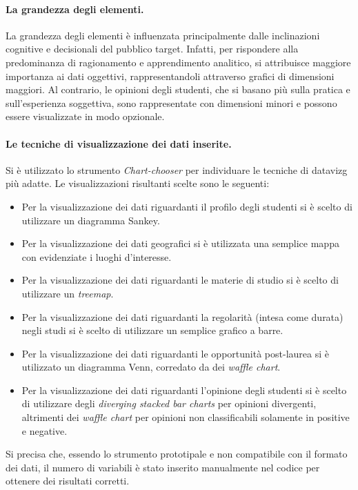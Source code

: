 \paragraph{La grandezza degli elementi.} La grandezza degli elementi è influenzata principalmente dalle inclinazioni cognitive e decisionali del pubblico target. 
Infatti, per rispondere alla predominanza di ragionamento e apprendimento analitico, si attribuisce maggiore importanza ai dati oggettivi, rappresentandoli attraverso grafici di dimensioni maggiori. 
Al contrario, le opinioni degli studenti, che si basano più sulla pratica e sull'esperienza soggettiva, sono rappresentate con dimensioni minori e possono essere visualizzate in modo opzionale.

\paragraph{Le tecniche di visualizzazione dei dati inserite.}
Si è utilizzato lo strumento \emph{Chart-chooser} per individuare le tecniche di \gls{datavizg} più adatte. 
Le visualizzazioni risultanti scelte sono le seguenti:
\begin{itemize}
    \item Per la visualizzazione dei dati riguardanti il profilo degli studenti si è scelto di utilizzare un diagramma Sankey. 
    \item Per la visualizzazione dei dati geografici si è utilizzata una semplice mappa con evidenziate i luoghi d'interesse.
    \item Per la visualizzazione dei dati riguardanti le materie di studio si è scelto di utilizzare un \emph{treemap}.
    \item Per la visualizzazione dei dati riguardanti la regolarità (intesa come durata) negli studi si è scelto di utilizzare un semplice grafico a barre.
    \item Per la visualizzazione dei dati riguardanti le opportunità post-laurea si è utilizzato un diagramma Venn, corredato da dei \emph{waffle chart}.
    \item Per la visualizzazione dei dati riguardanti l'opinione degli studenti si è scelto di utilizzare degli \emph{diverging stacked bar charts} per opinioni
    divergenti, altrimenti dei \emph{waffle chart} per opinioni non classificabili solamente in positive e negative.
\end{itemize}
Si precisa che, essendo lo strumento prototipale e non compatibile con il formato dei dati, il numero di variabili è stato inserito manualmente nel codice per ottenere dei risultati corretti.

